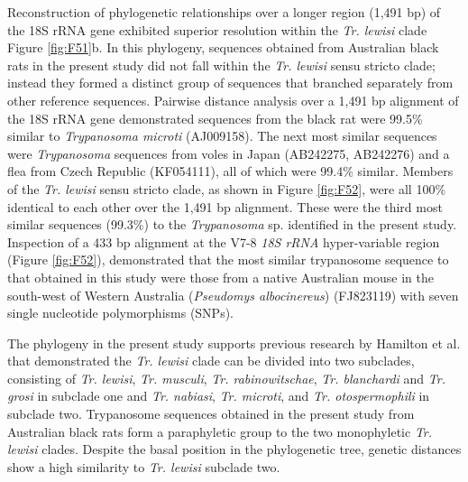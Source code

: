 \documentclass[a4paper, nobind]{templates/ociamthesis}
\begin{document}
Reconstruction of phylogenetic relationships over a longer region (1,491 bp) of the 18S rRNA gene exhibited superior resolution within the \emph{Tr. lewisi} clade Figure \ref{fig:F51}b. In this phylogeny, sequences obtained from Australian black rats in the present study did not fall within the \emph{Tr. lewisi} sensu stricto clade; instead they formed a distinct group of sequences that branched separately from other reference sequences. Pairwise distance analysis over a 1,491 bp alignment of the 18S rRNA gene demonstrated sequences from the black rat were 99.5\% similar to \emph{Trypanosoma microti} (AJ009158). The next most similar sequences were \emph{Trypanosoma} sequences from voles in Japan (AB242275, AB242276) and a flea from Czech Republic (KF054111), all of which were 99.4\% similar. Members of the \emph{Tr. lewisi} sensu stricto clade, as shown in Figure \ref{fig:F52}, were all 100\% identical to each other over the 1,491 bp alignment. These were the third most similar sequences (99.3\%) to the \emph{Trypanosoma} sp. identified in the present study. Inspection of a 433 bp alignment at the V7-8 \emph{18S rRNA} hyper-variable region (Figure \ref{fig:F52}), demonstrated that the most similar trypanosome sequence to that obtained in this study were those from a native Australian mouse in the south-west of Western Australia (\emph{Pseudomys albocinereus}) (FJ823119) with seven single nucleotide polymorphisms (SNPs).

The phylogeny in the present study supports previous research by Hamilton et al. \autocite*{hamiltonInadvertentIntroductionAustralia2005} that demonstrated the \emph{Tr. lewisi} clade can be divided into two subclades, consisting of \emph{Tr. lewisi}, \emph{Tr. musculi}, \emph{Tr. rabinowitschae}, \emph{Tr. blanchardi} and \emph{Tr. grosi} in subclade one and \emph{Tr. nabiasi}, \emph{Tr. microti}, and \emph{Tr. otospermophili} in subclade two. Trypanosome sequences obtained in the present study from Australian black rats form a paraphyletic group to the two monophyletic \emph{Tr. lewisi} clades. Despite the basal position in the phylogenetic tree, genetic distances show a high similarity to \emph{Tr. lewisi} subclade two.
\end{document}
